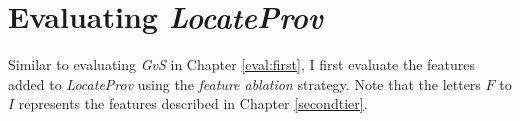 
\section{Evaluating {\it LocateProv}}
\label{eval:second}
Similar to evaluating {\it GvS} in Chapter \ref{eval:first}, I first evaluate the features added to {\it LocateProv} using the {\it feature ablation} strategy. Note that the letters $F$ to $I$ represents the features described in Chapter \ref{secondtier}.

